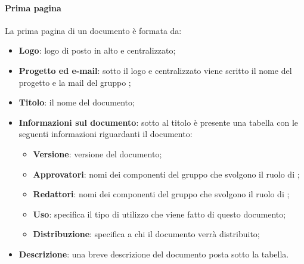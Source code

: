 \paragraph{Prima pagina}
La prima pagina di un documento è formata da:
\begin{itemize}
	
	\item \textbf{Logo}: logo di \Gruppo{} posto in alto e centralizzato;
	
	\item \textbf{Progetto ed e-mail}: sotto il logo e centralizzato viene scritto il nome del progetto e la mail del gruppo \Gruppo{};
	
	\item \textbf{Titolo}: il nome del documento;
	
	\item \textbf{Informazioni sul documento}: sotto al titolo è presente una tabella con le seguenti informazioni riguardanti il documento:
	
	\begin{itemize}
		
		\item \textbf{Versione}: versione del documento;
		
		\item \textbf{Approvatori}: nomi dei componenti del gruppo che svolgono il ruolo di ;
		
		\item \textbf{Redattori}: nomi dei componenti del gruppo che svolgono il ruolo di ;
	 	
	 	\item \textbf{Uso}: specifica il tipo di utilizzo che viene fatto di questo documento;
	 	
	 	\item \textbf{Distribuzione}: specifica a chi il documento verrà distribuito;
	 	
	\end{itemize}
	
	\item \textbf{Descrizione}: una breve descrizione del documento posta sotto la tabella.
\end{itemize}

